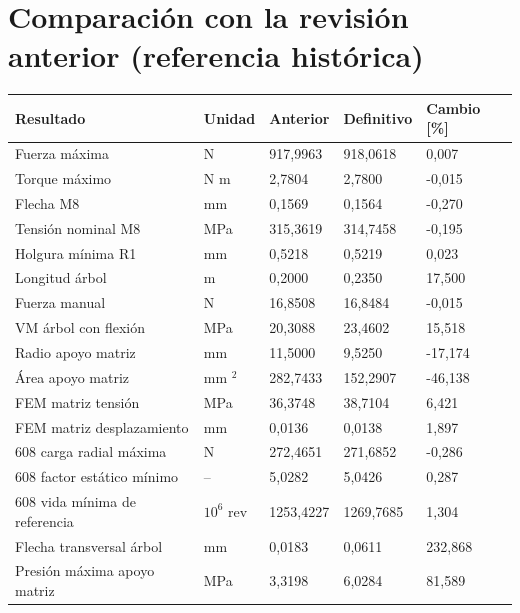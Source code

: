 \section*{Comparación con la revisión anterior (referencia histórica)}
\begin{center}\begin{tabular}{lllll}\toprule
Resultado & Unidad & Anterior & Definitivo & Cambio [\%]\\\midrule
Fuerza máxima & N & 917,9963 & 918,0618 & 0,007\\
Torque máximo & N m & 2,7804 & 2,7800 & -0,015\\
Flecha M8 & mm & 0,1569 & 0,1564 & -0,270\\
Tensión nominal M8 & MPa & 315,3619 & 314,7458 & -0,195\\
Holgura mínima R1 & mm & 0,5218 & 0,5219 & 0,023\\
Longitud árbol & m & 0,2000 & 0,2350 & 17,500\\
Fuerza manual & N & 16,8508 & 16,8484 & -0,015\\
VM árbol con flexión & MPa & 20,3088 & 23,4602 & 15,518\\
Radio apoyo matriz & mm & 11,5000 & 9,5250 & -17,174\\
Área apoyo matriz & mm $^2$ & 282,7433 & 152,2907 & -46,138\\
FEM matriz tensión & MPa & 36,3748 & 38,7104 & 6,421\\
FEM matriz desplazamiento & mm & 0,0136 & 0,0138 & 1,897\\
608 carga radial máxima & N & 272,4651 & 271,6852 & -0,286\\
608 factor estático mínimo & -- & 5,0282 & 5,0426 & 0,287\\
608 vida mínima de referencia & $10^6$ rev & 1253,4227 & 1269,7685 & 1,304\\
Flecha transversal árbol & mm & 0,0183 & 0,0611 & 232,868\\
Presión máxima apoyo matriz & MPa & 3,3198 & 6,0284 & 81,589\\
\bottomrule\end{tabular}\end{center}
